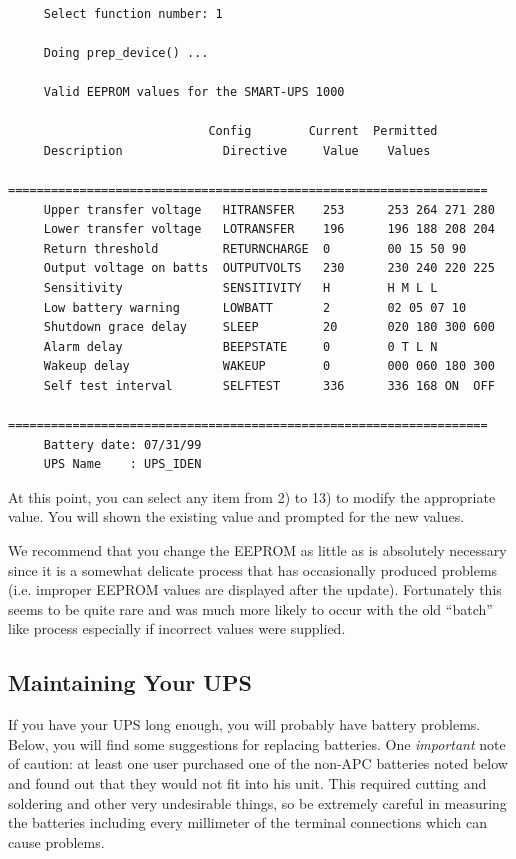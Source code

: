 {{{{{{{{{\footnotesize
\begin{verbatim}
     
     Select function number: 1
     
     Doing prep_device() ...
     
     Valid EEPROM values for the SMART-UPS 1000
     
                            Config        Current  Permitted
     Description              Directive     Value    Values
     ===================================================================
     Upper transfer voltage   HITRANSFER    253      253 264 271 280
     Lower transfer voltage   LOTRANSFER    196      196 188 208 204
     Return threshold         RETURNCHARGE  0        00 15 50 90
     Output voltage on batts  OUTPUTVOLTS   230      230 240 220 225
     Sensitivity              SENSITIVITY   H        H M L L
     Low battery warning      LOWBATT       2        02 05 07 10
     Shutdown grace delay     SLEEP         20       020 180 300 600
     Alarm delay              BEEPSTATE     0        0 T L N
     Wakeup delay             WAKEUP        0        000 060 180 300
     Self test interval       SELFTEST      336      336 168 ON  OFF
     ===================================================================
     Battery date: 07/31/99
     UPS Name    : UPS_IDEN
\end{verbatim}
\normalsize

At this point, you can select any item from 2) to 13) to modify the
appropriate value. You will shown the existing value and prompted for the new
values.  

We recommend that you change the EEPROM as little as is absolutely necessary
since it is a somewhat delicate process that has occasionally produced
problems (i.e. improper EEPROM values are displayed after the update).
Fortunately this seems to be quite rare and was much more likely to occur with
the old ``batch'' like process especially if incorrect values were supplied. 

\label{Maintaining-Your-UPS}

\subsection*{Maintaining Your UPS}

\label{index-Maintenance-144}
If you have your UPS long enough, you will probably have battery problems.
Below, you will find some suggestions for replacing batteries. One {\it
important} note of caution: at least one user purchased one of the non-APC
batteries noted below and found out that they would not fit into his unit.
This required cutting and soldering and other very undesirable things, so be
extremely careful in measuring the batteries including every millimeter of the
terminal connections which can cause problems.  

}}}}}}}}}
